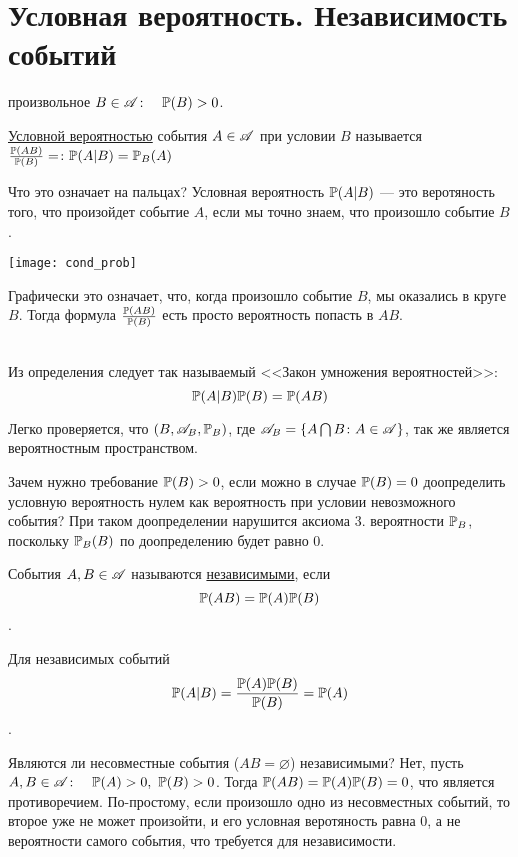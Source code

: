 \documentclass[../TV&MS.tex]{subfiles}
\begin{document}
\section{Условная вероятность. Независимость событий}

 произвольное $B \in \mathscr{A} \colon \quad \mathbb{P}(B) > 0$.
\begin{Def}
\underline{Условной вероятностью} события $A \in \mathscr{A}$ при условии $B$ называется $\frac{\mathbb{P}(AB)}{\mathbb{P}(B)} =\colon \mathbb{P}(A|B) = \mathbb{P}_B(A)$
\end{Def}

Что это означает на пальцах? Условная вероятность $\mathbb{P}(A|B)$ --- это веротяность того, что произойдет событие $A$, если мы точно знаем, что произошло событие $B$.\\

\parbox[b][3 cm][t]{20mm}{\texttt{[image: cond\_prob]}}
\hfill
\parbox[b][3 cm][t]{100mm}{
	Графически это означает, что, когда произошло событие $B$, мы оказались в круге $B$. Тогда формула  $\frac{\mathbb{P}(AB)}{\mathbb{P}(B)}$ есть просто вероятность попасть в $AB$.
}\\

Из определения следует так называемый <<Закон умножения вероятностей>>:
$$\mathbb{P}(A|B)\mathbb{P}(B)=\mathbb{P}(AB)$$

Легко проверяется, что $(B, \mathscr{A}_B, \mathbb{P}_B)$, где $\mathscr{A}_B = \left\{ A \bigcap B \colon A \in \mathscr{A} \right\}$, так же является вероятностным пространством. \\
\begin{Wtf}
Зачем нужно требование $\mathbb{P}(B) > 0$, если можно в случае $\mathbb{P}(B) = 0$ доопределить условную вероятность нулем как вероятность при условии невозможного события?
При таком доопределении нарушится аксиома 3. вероятности $\mathbb{P}_B$, поскольку $\mathbb{P}_B(B)$ по доопределению будет равно $0$.
\end{Wtf}

\begin{Def}
События $A, B \in \mathscr{A}$ называются \underline{независимыми}, если $$\mathbb{P}(AB) = \mathbb{P}(A) \mathbb{P}(B)$$.
\end{Def}

Для независимых событий $$\mathbb{P}(A|B) = \frac{\mathbb{P}(A)\mathbb{P}(B)}{\mathbb{P}(B)} = \mathbb{P}(A)$$.\\
\begin{Ex}
Являются ли несовместные события ($AB = \varnothing$) независимыми? Нет, пусть  $A, B \in \mathscr{A} \colon \quad \mathbb{P}(A) > 0, \ \mathbb{P}(B) > 0$. Тогда $\mathbb{P}(AB) = \mathbb{P}(A)\mathbb{P}(B) = 0$, 
что является противоречием. По-простому, если произошло одно из несовместных событий, то второе уже не может произойти, и его условная веротяность равна 0, а не
вероятности самого события, что требуется для независимости.
\end{Ex}
\end{document}
